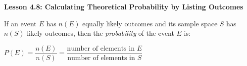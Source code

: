    \begin{center}
\textbf{Lesson 4.8: Calculating Theoretical Probability by Listing Outcomes}
\end{center}

\vspace*{-1.5ex}

If an event $E$ has $n(E)$ equally likely outcomes and its sample space $S$ has $n(S)$ likely outcomes, then the \emph{probability} of the event $E$ is:


 
{\centering $ P(E) = \dfrac{n(E)}{n(S)} = \dfrac{\text{number of elements in } E}{\text{number of elements in }S} $\par}
 
